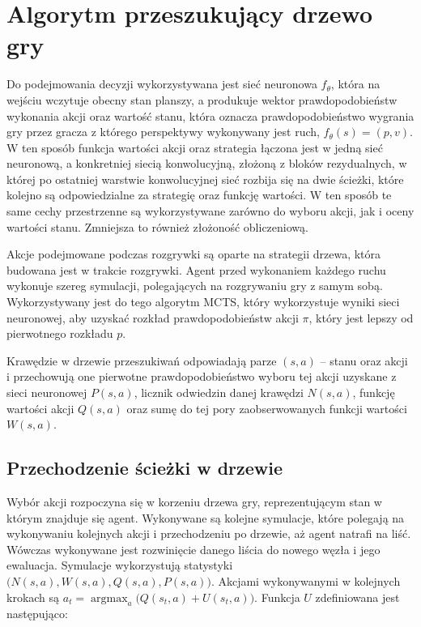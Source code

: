 \documentclass[licencjacka]{pracamgr}
\begin{document}
\section{Algorytm przeszukujący drzewo gry}

Do podejmowania decyzji wykorzystywana jest sieć neuronowa $f_\theta$, która na wejściu wczytuje obecny stan planszy, a produkuje wektor prawdopodobieństw wykonania akcji oraz wartość stanu, która oznacza prawdopodobieństwo wygrania gry przez gracza z którego perspektywy wykonywany jest ruch, $f_\theta(s) = (p, v)$. W ten sposób funkcja wartości akcji oraz strategia łączona jest w jedną sieć neuronową, a konkretniej siecią konwolucyjną, złożoną z bloków rezydualnych, w której po ostatniej warstwie konwolucyjnej sieć rozbija się na dwie ścieżki, które kolejno są odpowiedzialne za strategię oraz funkcję wartości. W ten sposób te same cechy przestrzenne są wykorzystywane zarówno do wyboru akcji, jak i oceny wartości stanu. Zmniejsza to również złożoność obliczeniową.

Akcje podejmowane podczas rozgrywki są oparte na strategii drzewa, która budowana jest w trakcie rozgrywki. Agent przed wykonaniem każdego ruchu wykonuje szereg symulacji, polegających na rozgrywaniu gry z samym sobą. Wykorzystywany jest do tego algorytm MCTS, który wykorzystuje wyniki sieci neuronowej, aby uzyskać rozkład prawdopodobieństw akcji $\pi$, który jest lepszy od pierwotnego rozkładu $p$. 

Krawędzie w drzewie przeszukiwań odpowiadają parze $(s, a)$ -- stanu oraz akcji i przechowują one pierwotne prawdopodobieństwo wyboru tej akcji uzyskane z sieci neuronowej $P(s, a)$, licznik odwiedzin danej krawędzi $N(s,a)$, funkcję wartości akcji $Q(s,a)$ oraz sumę do tej pory zaobserwowanych funkcji wartości $W(s,a)$. 

\subsection{Przechodzenie ścieżki w drzewie}

Wybór akcji rozpoczyna się w korzeniu drzewa gry, reprezentującym stan w którym znajduje się agent. Wykonywane są kolejne symulacje, które polegają na wykonywaniu kolejnych akcji i przechodzeniu po drzewie, aż agent natrafi na liść. Wówczas wykonywane jest rozwinięcie danego liścia do nowego węzła i jego ewaluacja. Symulacje wykorzystują statystyki $\big(N(s,a), W(s,a), Q(s,a), P(s,a) \big)$. Akcjami wykonywanymi w kolejnych krokach są $a_t = \operatorname*{argmax}_a \big( Q(s_t, a) + U(s_t, a) \big)$. Funkcja $U$ zdefiniowana jest następująco:
\end{document}
